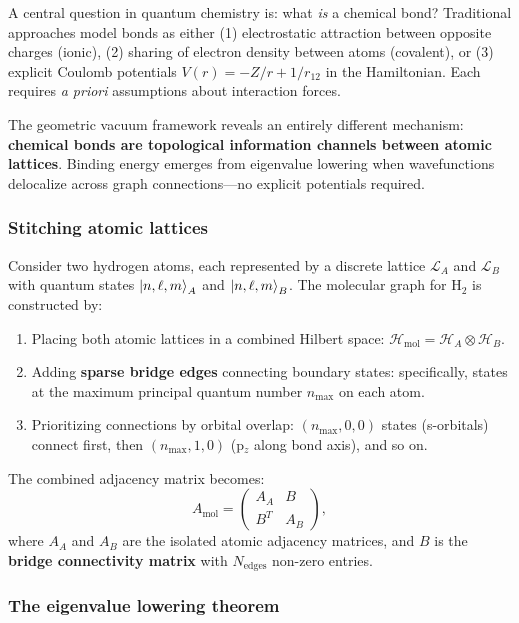 \documentclass[aps,prd,twocolumn,superscriptaddress,groupedaddress,showpacs]{revtex4-2}
\begin{document}
A central question in quantum chemistry is: what \emph{is} a chemical bond? Traditional approaches model bonds as either (1) electrostatic attraction between opposite charges (ionic), (2) sharing of electron density between atoms (covalent), or (3) explicit Coulomb potentials $V(r) = -Z/r + 1/r_{12}$ in the Hamiltonian. Each requires \emph{a priori} assumptions about interaction forces.

The geometric vacuum framework reveals an entirely different mechanism: \textbf{chemical bonds are topological information channels between atomic lattices}. Binding energy emerges from eigenvalue lowering when wavefunctions delocalize across graph connections---no explicit potentials required.

\subsubsection{Stitching atomic lattices}

Consider two hydrogen atoms, each represented by a discrete lattice $\mathcal{L}_A$ and $\mathcal{L}_B$ with quantum states $\ket{n,\ell,m}_A$ and $\ket{n,\ell,m}_B$. The molecular graph for H$_2$ is constructed by:
\begin{enumerate}
\item Placing both atomic lattices in a combined Hilbert space: $\mathcal{H}_{\text{mol}} = \mathcal{H}_A \otimes \mathcal{H}_B$.
\item Adding \textbf{sparse bridge edges} connecting boundary states: specifically, states at the maximum principal quantum number $n_{\text{max}}$ on each atom.
\item Prioritizing connections by orbital overlap: $(n_{\text{max}}, 0, 0)$ states (s-orbitals) connect first, then $(n_{\text{max}}, 1, 0)$ (p$_z$ along bond axis), and so on.
\end{enumerate}

The combined adjacency matrix becomes:
\begin{equation}
A_{\text{mol}} = \begin{pmatrix}
A_A & B \\
B^T & A_B
\end{pmatrix},
\end{equation}
where $A_A$ and $A_B$ are the isolated atomic adjacency matrices, and $B$ is the \textbf{bridge connectivity matrix} with $N_{\text{edges}}$ non-zero entries.

\subsubsection{The eigenvalue lowering theorem}
\end{document}
